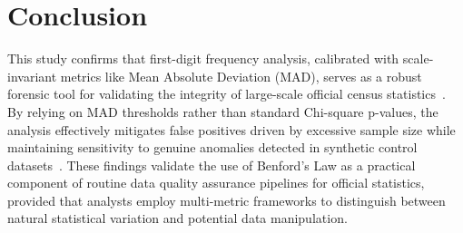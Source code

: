 \documentclass[11pt,a4paper]{article}
\begin{document}
\section{Conclusion}
This study confirms that first-digit frequency analysis, calibrated with scale-invariant metrics like Mean Absolute Deviation (MAD), serves as a robust forensic tool for validating the integrity of large-scale official census statistics~\cite{Azevedo2021ABL}. By relying on MAD thresholds rather than standard Chi-square p-values, the analysis effectively mitigates false positives driven by excessive sample size while maintaining sensitivity to genuine anomalies detected in synthetic control datasets~\cite{Cerqueti2021SomeNT,Kossler2024SomeNI}. These findings validate the use of Benford's Law as a practical component of routine data quality assurance pipelines for official statistics, provided that analysts employ multi-metric frameworks to distinguish between natural statistical variation and potential data manipulation.



\printbibliography
\end{document}
